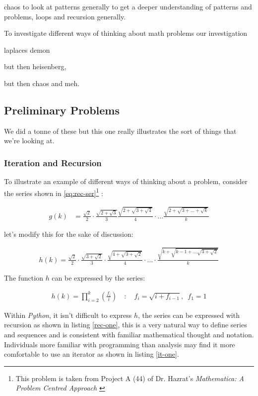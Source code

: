 \documentclass[11pt]{article}
\begin{document}
chaos to look at patterns generally to get a deeper understanding of patterns
and problems, loops and recursion generally.

To investigate different ways of thinking about math problems our investigation

laplaces demon

but then heisenberg,

but then chaos and meh.

\subsection{Preliminary Problems}
\label{sec:org04c5fb6}
We did a tonne of these but this one really illustrates the sort of things that we're looking at.
\subsubsection{Iteration and Recursion}
\label{series-and-recursion}
To illustrate an example of different ways of thinking about a problem, consider the series shown in \eqref{eq:rec-ser}\footnote{This problem is taken from Project A (44) of Dr. Hazrat's \emph{Mathematica: A Problem Centred Approach} \cite{hazratMathematicaProblemCenteredApproach2015}} :

\begin{align}
    g\left( k \right) &=  \frac{\sqrt{2} }{2} \cdot   \frac{\sqrt{2+  \sqrt{3}}  }{3} \frac{\sqrt{2 +  \sqrt{3 +  \sqrt{4} } } }{4} \cdot  \ldots \frac{\sqrt{2 +  \sqrt{3 +  \ldots +  \sqrt{k} } } }{k} \label{eq:rec-ser}
\end{align}

let's modify this for the sake of discussion:

\begin{align}
h\left( k \right) = \frac{\sqrt{2}  }{2} \cdot  \frac{\sqrt{3 +  \sqrt{2} } }{3} \cdot  \frac{\sqrt{4 +  \sqrt{3 +  \sqrt{2} } } }{4} \cdot  \ldots \cdot  \frac{\sqrt{k +  \sqrt{k - 1 +  \ldots \sqrt{3 + \sqrt{2}  } } } }{k} \label{eq:rec-ser-mod}
\end{align}

The function \(h\) can be expressed by the series:

$$\begin{aligned}
h\left( k \right) = \prod^k_{i = 2} \left( \frac{f_i}{i}  \right)  \quad : \quad f_i = \sqrt{i +  f_{i - 1}}, \enspace f_{1} = 1
\end{aligned}$$

Within \emph{Python}, it isn't difficult to express \(h\), the series can be expressed with recursion as shown in listing \ref{rec-one}, this is a very natural way to define series and sequences and is consistent with familiar mathematical thought and notation. Individuals more familiar with programming than analysis may find it more comfortable to use an iterator as shown in listing \ref{it-one}.
\end{document}
